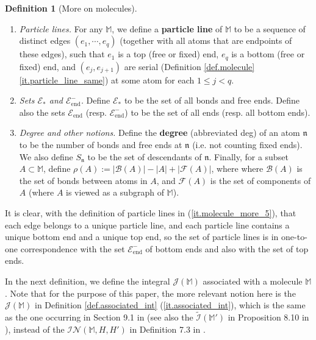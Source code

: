 \documentclass[10pt, reqno]{amsart}
\newcommand{\newterm}[1]{{\textbf{#1}}}
\newcommand{\Mb}{\mathbb M}
\newcommand{\Bc}{\mathcal B}
\newcommand{\Ec}{\mathcal E}
\newcommand{\Fc}{\mathcal F}
\newcommand{\Ic}{\mathcal I}
\newcommand {\Jc}{\mathcal J}
\newcommand{\Nc}{\mathcal N}
\newcommand{\nf}{\mathfrak n}
\theoremstyle{definition}
\newtheorem{definition}[theorem]{Definition}
\theoremstyle{remark}
\numberwithin{equation}{section}
\begin{document}
\begin{definition}[More on molecules]
\begin{enumerate}
    \item\label{it.molecule_more_5} \emph{Particle lines.} For any $\Mb$, we define a \newterm{particle line} of $\Mb$ to be a sequence of distinct edges $(e_1,\cdots,e_q)$ (together with all atoms that are endpoints of these edges), such that $e_1$ is a top (free or fixed) end, $e_q$ is a bottom (free or fixed) end, and $(e_j,e_{j+1})$ are serial (Definition \ref{def.molecule} \eqref{it.particle_line_same}) at some atom for each $1\leq j<q$. 
    \item\label{it.subsets_Ec} \emph{Sets $\Ec_*$ and $\Ec_{\mathrm{end}}^-$.} Define $\Ec_*$ to be the set of all bonds and free ends. Define also the sets $\Ec_{\mathrm{end}}$ (resp. $\Ec_{\mathrm{end}}^-$) to be the set of all ends (resp. all bottom ends).
    \item\label{it.deg}\emph{Degree and other notions.} Define the \textbf{degree} (abbreviated deg) of an atom $\nf$ to be the number of bonds and free ends at $\nf$ (i.e. not counting fixed ends). We also define $S_\nf$ to be the set of descendants of $\nf$. Finally, for a subset $A\subset\Mb$, define $\rho(A):=|\Bc(A)|-|A|+|\Fc(A)|$, where where $\Bc(A)$ is the set of bonds between atoms in $A$, and $\Fc(A)$ is the set of components of $A$ (where $A$ is viewed as a subgraph of $\Mb$).
\end{enumerate}

It is clear, with the definition of particle lines in (\ref{it.molecule_more_5}), that each edge belongs to a unique particle line, and each particle line contains a unique bottom end and a unique top end, so the set of particle lines is in one-to-one correspondence with the set $\Ec_{\mathrm{end}}^-$ of bottom ends and also with the set of top ends.
\end{definition}
In the next definition, we define the integral $\Jc(\Mb)$ associated with a molecule $\Mb$. Note that for the purpose of this paper, the more relevant notion here is the $\Jc(\Mb)$ in Definition \ref{def.associated_int} (\ref{it.associated_int}), which is the same as the one occurring in Section 9.1 in \cite{DHM24} (see also the $\widetilde{\Ic}(\Mb')$ in Proposition 8.10 in \cite{DHM24}), instead of the $\Ic\Nc(\Mb,H,H')$ in Definition 7.3 in \cite{DHM24}.
\end{document}
